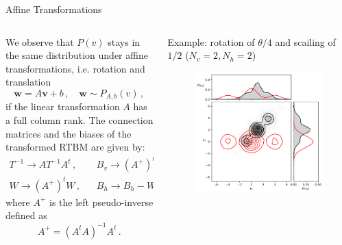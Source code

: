 \documentclass[10pt]{beamer}
\begin{document}
\begin{frame}{Affine Transformations}
    \begin{columns}
        \begin{column}{0.5 \textwidth}
            We observe that $P(v)$ stays in the same distribution under affine
            transformations, i.e. rotation and translation
            $$
            \mathbf w = A \mathbf v+b\,, \quad \mathbf w \sim P_{A,b}(v)\,,
            $$
            if the linear transformation $A$ has a full column rank.
            The connection matrices and the biases of the transformed RTBM are given by:
            \begin{equation*}
            \begin{split}
            T^{-1}\rightarrow AT^{-1}A^t\,,&\,\,\,\,\, B_v \rightarrow (A^+)^t B_v-Tb\,,\\
            W\rightarrow (A^+)^t W\,,&\,\,\,\,\, B_h\rightarrow B_h - W^tb \,.
            \end{split}
            \end{equation*}
            where $A^+$ is the left pseudo-inverse defined as
            \begin{equation*}\label{leftinverse}
            A^+ = (A^t A)^{-1}A^t\,.
            \end{equation*}
        \end{column}
        \begin{column}{0.5 \textwidth}
            \centering
            Example: rotation of $\theta / 4$ and scailing of $1/2$ ($N_v = 2, N_h =2 $)
    \begin{figure}
        \begin{center}
          \includegraphics[scale=0.4]{figures/rotation2d.pdf}

\end{center}
\end{figure}
\end{column}
\end{columns}
\end{frame}
\end{document}
